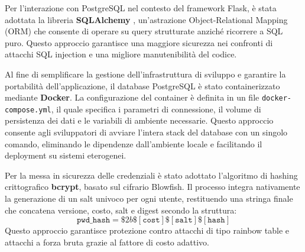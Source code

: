 Per l'interazione con PostgreSQL nel contesto del framework Flask, è stata adottata la libreria \textbf{SQLAlchemy} \cite{sqlalchemy}, un'astrazione Object-Relational Mapping (ORM) che consente di operare su query strutturate anziché ricorrere a SQL puro. Questo approccio garantisce una maggiore sicurezza nei confronti di attacchi SQL injection e una migliore manutenibilità del codice.

Al fine di semplificare la gestione dell'infrastruttura di sviluppo e garantire la portabilità dell'applicazione, il database PostgreSQL è stato containerizzato mediante \textbf{Docker}. La configurazione del container è definita in un file \texttt{docker-compose.yml}, il quale specifica i parametri di connessione, il volume di persistenza dei dati e le variabili di ambiente necessarie. Questo approccio consente agli sviluppatori di avviare l'intera stack del database con un singolo comando, eliminando le dipendenze dall'ambiente locale e facilitando il deployment su sistemi eterogenei.

Per la messa in sicurezza delle credenziali è stato adottato l'algoritmo di hashing crittografico \textbf{bcrypt}, basato sul cifrario Blowfish. Il processo integra nativamente la generazione di un salt univoco per ogni utente, restituendo una stringa finale che concatena versione, costo, salt e digest secondo la struttura:
\[
    \texttt{pwd\_hash}=\$2b\$[\texttt{cost}]\$[\texttt{salt}]\$[\texttt{hash}]
\]
Questo approccio garantisce protezione contro attacchi di tipo rainbow table e attacchi a forza bruta grazie al fattore di costo adattivo.